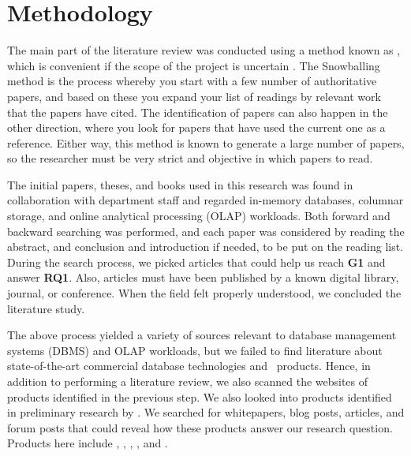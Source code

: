 \section{Methodology}
\label{sec:Methodology}
The main part of the literature review was conducted using a method known as , which is convenient if the scope of the project is uncertain \cite{Ang2014-nm}. The Snowballing method is the process whereby you start with a few number of authoritative papers, and based on these you expand your list of readings by relevant work that the papers have cited. The identification of papers can also happen in the other direction, where you look for papers that have used the current one as a reference. Either way, this method is known to generate a large number of papers, so the researcher must be very strict and objective in which papers to read.

The initial papers, theses, and books used in this research was found in collaboration with department staff and regarded in-memory databases, columnar storage, and online analytical processing (OLAP) workloads. Both forward and backward searching was performed, and each paper was considered by reading the abstract, and conclusion and introduction if needed, to be put on the reading list. During the search process, we picked articles that could help us reach \textbf{G1} and answer \textbf{RQ1}. Also, articles must have been published by a known digital library, journal, or conference. 
When the field felt properly understood, we concluded the  literature study.

The above process yielded a variety of sources relevant to database management systems (DBMS) and OLAP workloads, but we failed to find literature about state-of-the-art commercial database technologies and \bd~products. Hence, in addition to performing a  literature review, we also scanned the websites of products identified in the previous step. We also looked into products identified in preliminary research by \genus. We searched for whitepapers, blog posts, articles, and forum posts that could reveal how these products answer our research question. Products here include , , , , and .
